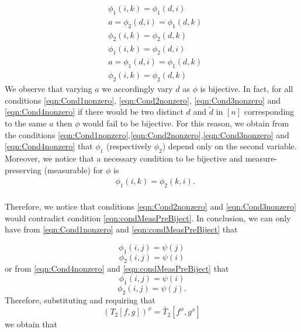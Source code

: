 \documentclass[11pt]{article}
\begin{document}
\begin{equation}\label{eqn:Cond3nonzero}
\begin{aligned}
&\phi_1(i,k)=\phi_1(d,i)\\
&a=\phi_2(d,i)=\phi_1(d,k)\\
&\phi_2(i,k)=\phi_2(d,k)
\end{aligned}
\end{equation}
\begin{equation}\label{eqn:Cond4nonzero}
\begin{aligned}
&\phi_1(i,k)=\phi_2(d,i)\\
&a=\phi_1(d,i)=\phi_1(d,k)\\
&\phi_2(i,k)=\phi_2(d,k)
\end{aligned}
\end{equation} 
We observe that varying $a$ we accordingly vary $d$ as $\phi$ is bijective. In fact, for all conditions \eqref{eqn:Cond1nonzero}, \eqref{eqn:Cond2nonzero}, \eqref{eqn:Cond3nonzero} and \eqref{eqn:Cond4nonzero} if there would be two distinct $d$ and $\tilde{d}$ in $[n]$ corresponding to the same $a$ then $\phi$ would fail to be bijective. For this reason, we obtain from the conditions \eqref{eqn:Cond1nonzero},\eqref{eqn:Cond2nonzero},\eqref{eqn:Cond3nonzero} and \eqref{eqn:Cond4nonzero} that $\phi_1$ (respectively $\phi_2$) depend only on the second variable. Moreover, we notice that a necessary condition to be bijective and measure-preserving (measurable) for $\phi$ is 
\begin{equation}\label{eqn:condMeasPreBiject}
\begin{aligned}
&\phi_1(i,k)=\phi_2(k,i).\\
\end{aligned}
\end{equation}


Therefore, we notice that conditions \eqref{eqn:Cond2nonzero} and \eqref{eqn:Cond3nonzero} would contradict condition \eqref{eqn:condMeasPreBiject}. In conclusion, we can only have from \eqref{eqn:Cond1nonzero} and \eqref{eqn:condMeasPreBiject} that 

$$
\phi_1(i,j)=\psi(j)
$$
$$
\phi_2(i,j)=\psi(i)
$$
or from \eqref{eqn:Cond4nonzero} and \eqref{eqn:condMeasPreBiject} that 
$$
\phi_1(i,j)=\psi(i)$$
$$
\phi_2(i,j)=\psi(j).
$$
Therefore, substituting and requiring that $$
(T_2[f,g])^{\phi}=\widetilde{T_2}[f^{\phi},g^{\phi}]
$$
we obtain that 
\end{document}
